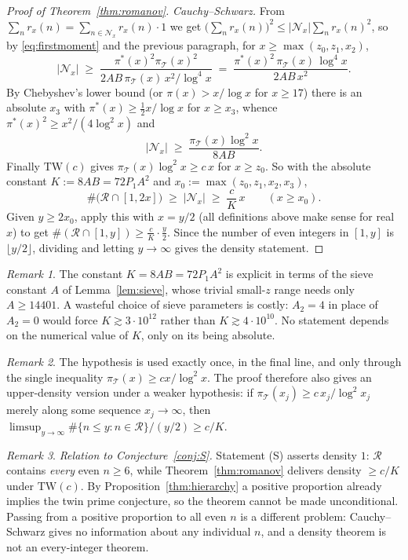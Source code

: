 \documentclass[10pt]{article}
\theoremstyle{definition}
\theoremstyle{remark}
\newtheorem{remark}{Remark}
\newcommand{\T}{\mathcal{T}}
\begin{document}
\begin{proof}[Proof of Theorem~\ref{thm:romanov}]
\emph{Cauchy--Schwarz.} From
$\sum_n r_x(n) = \sum_{n \in \mathcal{N}_x} r_x(n)\cdot 1$ we get
$\bigl(\sum_n r_x(n)\bigr)^{2} \le |\mathcal{N}_x| \sum_n r_x(n)^{2}$, so by
\eqref{eq:firstmoment} and the previous paragraph, for
$x \ge \max(z_0, z_1, x_2)$,
\[
  |\mathcal{N}_x| \;\ge\;
  \frac{\pi^{*}(x)^{2}\pi_\T(x)^{2}}{2AB\,\pi_\T(x)\,x^{2}/\log^{4}x}
  \;=\; \frac{\pi^{*}(x)^{2}\,\pi_\T(x)\,\log^{4}x}{2AB\,x^{2}} .
\]
By Chebyshev's lower bound (or $\pi(x) > x/\log x$ for $x \ge 17$) there is an
absolute $x_3$ with $\pi^{*}(x) \ge \tfrac12 x/\log x$ for $x \ge x_3$, whence
$\pi^{*}(x)^{2} \ge x^{2}/(4\log^{2}x)$ and
\[
  |\mathcal{N}_x| \;\ge\; \frac{\pi_\T(x)\log^{2}x}{8AB} .
\]
Finally $\mathrm{TW}(c)$ gives $\pi_\T(x)\log^{2}x \ge c\,x$ for $x \ge z_0$.
So with the absolute constant $K := 8AB = 72 P_1 A^{2}$ and
$x_0 := \max(z_0, z_1, x_2, x_3)$,
\[
  \#\bigl(\mathcal{R}\cap[1,2x]\bigr) \;\ge\; |\mathcal{N}_x|
  \;\ge\; \frac{c}{K}\,x \qquad (x \ge x_0).
\]
Given $y \ge 2x_0$, apply this with $x = y/2$ (all definitions above make
sense for real $x$) to get
$\#(\mathcal{R}\cap[1,y]) \ge \frac{c}{K}\cdot\frac{y}{2}$. Since the number of
even integers in $[1,y]$ is $\lfloor y/2\rfloor$, dividing and letting
$y \to \infty$ gives the density statement.
\end{proof}

\begin{remark}\label{rem:size}
The constant $K = 8AB = 72P_1A^{2}$ is explicit in terms of the sieve constant
$A$ of Lemma~\ref{lem:sieve}, whose trivial small-$z$ range needs only
$A \ge 14401$. A wasteful choice of sieve parameters is costly: $A_2 = 4$ in
place of $A_2 = 0$ would force $K \gtrsim 3\cdot10^{12}$ rather than
$K \gtrsim 4\cdot10^{10}$. No statement depends on the numerical value of $K$,
only on its being absolute.
\end{remark}

\begin{remark}
The hypothesis is used exactly once, in the final line, and only through the
single inequality $\pi_\T(x) \ge cx/\log^{2}x$. The proof therefore also gives
an upper-density version under a weaker hypothesis: if
$\pi_\T(x_j) \ge c\,x_j/\log^{2}x_j$ merely along some sequence
$x_j \to \infty$, then
$\limsup_{y\to\infty}\#\{n \le y : n \in \mathcal{R}\}/(y/2) \ge c/K$.
\end{remark}

\begin{remark}\label{rem:gap}
\emph{Relation to Conjecture~\ref{conj:S}.} Statement (S) asserts density
$1$: $\mathcal{R}$ contains \emph{every} even $n \ge 6$, while
Theorem~\ref{thm:romanov} delivers density
$\ge c/K$ under $\mathrm{TW}(c)$. By Proposition~\ref{thm:hierarchy} a
positive proportion already implies the twin prime conjecture, so the theorem
cannot be made unconditional. Passing from a positive proportion to all even
$n$ is a different problem: Cauchy--Schwarz gives no information about any
individual $n$, and a density theorem is not an every-integer theorem.
\end{remark}
\end{document}
